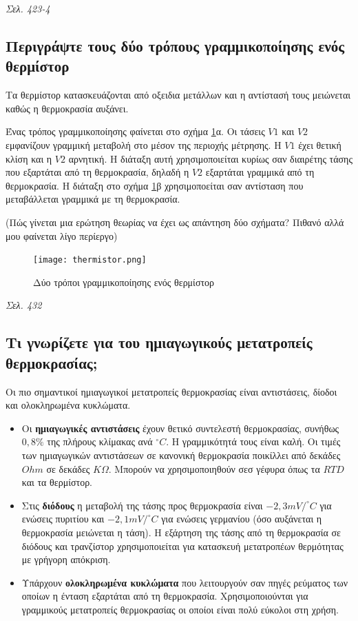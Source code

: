 \documentclass{article}
\begin{document}
\emph{Σελ. 423-4}

\subsection{Περιγράψτε τους δύο τρόπους γραμμικοποίησης ενός θερμίστορ}
Τα θερμίστορ κατασκευάζονται από οξειδια μετάλλων και η αντίστασή τους μειώνεται καθώς η θερμοκρασία αυξάνει. 

Ένας τρόπος γραμμικοποίησης φαίνεται στο σχήμα \ref{thermistor}α. Οι τάσεις $V1$ και $V2$ εμφανίζουν γραμμική μεταβολή στο μέσον της περιοχής μέτρησης. Η $V1$ έχει 
θετική κλίση και η $V2$ αρνητική. Η διάταξη αυτή χρησιμοποιείται κυρίως σαν διαιρέτης τάσης που εξαρτάται από τη θερμοκρασία, δηλαδή η $V2$ εξαρτάται γραμμικά από 
τη θερμοκρασία. Η διάταξη στο σχήμα \ref{thermistor}β χρησιμοποείται σαν αντίσταση που μεταβάλλεται γραμμικά με τη θερμοκρασία.

(Πώς γίνεται μια ερώτηση θεωρίας να έχει ως απάντηση δύο σχήματα? Πιθανό αλλά μου φαίνεται λίγο περίεργο)

\begin{figure}[h!]
    \texttt{[image: thermistor.png]}
    \caption{Δύο τρόποι γραμμικοποίησης ενός θερμίστορ}
    \label{thermistor}
\end{figure}

\emph{Σελ. 432}

\subsection{Τι γνωρίζετε για του ημιαγωγικούς μετατροπείς θερμοκρασίας;}
Οι πιο σημαντικοί ημιαγωγικοί μετατροπείς θερμοκρασίας είναι αντιστάσεις, δίοδοι και ολοκληρωμένα κυκλώματα.

\begin{itemize}
    \item Οι \textbf{ημιαγωγικές αντιστάσεις} έχουν θετικό συντελεστή θερμοκρασίας, συνήθως $0,8\%$ της πλήρους κλίμακας ανά $^{\circ}C$. Η γραμμικότητά τους είναι καλή.
        Οι τιμές των ημιαγωγικών αντιστάσεων σε κανονική θερμοκρασία ποικίλλει από δεκάδες $Ohm$ σε δεκάδες $K\Omega$. Μπορούν να χρησιμοποιηθούν σεσ γέφυρα όπως τα
        $RTD$ και τα θερμίστορ.
    \item Στις \textbf{διόδους} η μεταβολή της τάσης προς θερμοκρασία είναι $-2,3mV/^{\circ}C$ για ενώσεις πυριτίου και $-2,1mV/^{\circ}C$ για ενώσεις γερμανίου (όσο 
        αυξάνεται η θερμοκρασία μειώνεται η τάση). Η εξάρτηση της τάσης από τη θερμοκρασία σε διόδους και τρανζίστορ χρησιμοποιείται για κατασκευή μετατροπέων θερμότητας
        με γρήγορη απόκριση.
    \item Υπάρχουν \textbf{ολοκληρωμένα κυκλώματα} που λειτουργούν σαν πηγές ρεύματος των οποίων η ένταση εξαρτάται από τη θερμοκρασία. Χρησιμοποιούνται για γραμμικούς
        μετατροπείς θερμοκρασίας οι οποίοι είναι πολύ εύκολοι στη χρήση.
\end{itemize}
\end{document}
